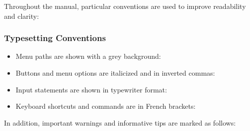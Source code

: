 Throughout the manual, particular conventions are used to improve readability and clarity:

\subsubsection{Typesetting Conventions}

\begin{itemize}
\item Menu paths are shown with a grey background:\\
\item Buttons and menu options are italicized and in inverted commas:\\
\item Input statements are shown in typewriter format:\\
\item Keyboard shortcuts and commands are in French brackets:\\
\end{itemize}

In addition, important warnings and informative tips are marked as follows:

\bigskip\bigskip
{}





